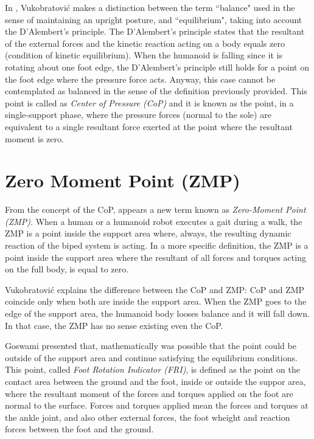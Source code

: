 In \cite{Vuk}, Vukobratović makes a distinction between the term ``balance" used in the sense of maintaining an upright posture, and ``equilibrium", taking into account the D'Alembert's principle. The D'Alembert's principle states that the resultant of the external forces and the kinetic reaction acting on a body equals zero (condition of kinetic equilibrium). When the humanoid is falling since it is rotating about one foot edge, the D’Alembert’s principle still holds for a point on the foot edge where the pressure force acts. Anyway, this case cannot be contemplated as balanced in the sense of the definition previously provided. This point is called as \textit{Center of Pressure (CoP)} and it is known as the point, in a single-support phase, where the pressure forces (normal to the sole) are equivalent to a single resultant force exerted at the point where the resultant moment is zero.

\section{Zero Moment Point (ZMP)}
From the concept of the CoP, appears a new term known as \textit{Zero-Moment Point (ZMP)}. When a human or a humanoid robot executes a gait during a walk, the ZMP is a point inside the support area where, always, the resulting dynamic reaction of the biped system is acting. In a more specific definition, the ZMP is a point inside the support area where the resultant of all forces and torques acting on the full body, is equal to zero.

Vukobratović \cite{Vuk} explains the difference between the CoP and ZMP: CoP and ZMP coincide only when both are inside the support area. When the ZMP goes to the edge of the support area, the humanoid body looses balance and it will fall down. In that case, the ZMP has no sense existing even the CoP.

Goswami \cite{Gos} presented that, mathematically was possible that the point could be outside of the support area and continue satisfying the equilibrium conditions. This point, called \textit{Foot Rotation Indicator (FRI)}, is defined as the point on the contact area between the ground and the foot, inside or outside the suppor area, where the resultant moment of the forces and torques applied on the foot are normal to the surface. Forces and torques applied mean the forces and torques at the ankle joint, and also other external forces, the foot wheight and reaction forces between the foot and the ground. 

